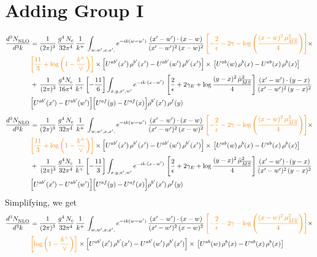 \documentclass[9pt]{article}
\numberwithin{equation}{section}
\begin{document}
\section{Adding Group I}
\begin{align}
     \frac{d^{3}N_{\rm NLO}^{\rm}}{d^{3}k} &  =  \frac{1}{(2\pi)^{3}}\, \frac{g^{4}\,N_{c}}{32\pi^{4}}\,\frac{1}{k^{+}}\, \int_{w, w',x,x',} e^{-ik(w-w^\prime)}\, \frac{(x'-w')\cdot (x-w)}{(x'-w')^{2}\, (x-w)^{2}}\, {\color{orange}\left[-\frac{2}{\epsilon}-2\gamma-\log{\left(\frac{(x-w)^{2}\,\mu^{2}_{\overline{MS}}}{4}\right)}\right]}\times \notag \\ & {\color{orange}\left[\frac{11}{3}+\log{\left(1-\frac{k^{+}}{\vee}\right)}\right]}\times\left[U^{ab'}(x')\,\rho^{b'}(x') - U^{ab'}(w')\,\rho^{b'}(x')\right]\times\,\left[U^{ab}(w)\,\rho^{b}(x) - U^{ab}(x)\,\rho^{b}(x)\right]\notag \\ & +\,\frac{1}{(2\pi)^{3}}\,\frac{g^{4}N_{c}}{16\pi^{4}}\,\frac{1}{k^{+}}\left[-\frac{11}{6}\right]\int_{x,y,x',w'}e^{-ik\cdot(x-w')}\,\left[\frac{2}{\epsilon}+2\gamma_{E}+\log\frac{(y-x)^{2}\,\bar\mu^{2}_{\overline{MS}}}{4}\right]\frac{(x'-w')\cdot(y-x)}{(x'-w')^{2}\,(y-x)^{2}}\notag \\ & \Big[U^{ab'}(x')-U^{ab'}(w')\Big]\Big[U^{af}(y)-U^{af}(x)\Big]\rho^{b'}(x')\,\rho^{f}(y)
\end{align}
\begin{align}
     \frac{d^{3}N_{\rm NLO}^{\rm}}{d^{3}k} &  =  \frac{1}{(2\pi)^{3}}\, \frac{g^{4}\,N_{c}}{32\pi^{4}}\,\frac{1}{k^{+}}\, \int_{w, w',x,x',} e^{-ik(w-w^\prime)}\, \frac{(x'-w')\cdot (x-w)}{(x'-w')^{2}\, (x-w)^{2}}\, {\color{orange}\left[-\frac{2}{\epsilon}-2\gamma-\log{\left(\frac{(x-w)^{2}\,\mu^{2}_{\overline{MS}}}{4}\right)}\right]}\times \notag \\ & {\color{orange}\left[\frac{11}{3}+\log{\left(1-\frac{k^{+}}{\vee}\right)}\right]}\times\left[U^{ab'}(x')\,\rho^{b'}(x') - U^{ab'}(w')\,\rho^{b'}(x')\right]\times\,\left[U^{ab}(w)\,\rho^{b}(x) - U^{ab}(x)\,\rho^{b}(x)\right]\notag \\ & +\,\frac{1}{(2\pi)^{3}}\,\frac{g^{4}N_{c}}{32\pi^{4}}\,\frac{1}{k^{+}}\left[-\frac{11}{3}\right]\int_{x,y,x',w'}e^{-ik\cdot(x-w')}\,\left[\frac{2}{\epsilon}+2\gamma_{E}+\log\frac{(y-x)^{2}\,\bar\mu^{2}_{\overline{MS}}}{4}\right]\frac{(x'-w')\cdot(y-x)}{(x'-w')^{2}\,(y-x)^{2}}\notag \\ & \Big[U^{ab'}(x')-U^{ab'}(w')\Big]\Big[U^{af}(y)-U^{af}(x)\Big]\rho^{b'}(x')\,\rho^{f}(y)
\end{align}
Simplifying, we get
\begin{align}
     \frac{d^{3}N_{\rm NLO}^{\rm}}{d^{3}k} &  =  \frac{1}{(2\pi)^{3}}\, \frac{g^{4}\,N_{c}}{32\pi^{4}}\,\frac{1}{k^{+}}\, \int_{w, w',x,x',} e^{-ik(w-w^\prime)}\, \frac{(x'-w')\cdot (x-w)}{(x'-w')^{2}\, (x-w)^{2}}\, {\color{orange}\left[-\frac{2}{\epsilon}-2\gamma-\log{\left(\frac{(x-w)^{2}\,\mu^{2}_{\overline{MS}}}{4}\right)}\right]}\times \notag \\ & {\color{orange}\left[\log{\left(1-\frac{k^{+}}{\vee}\right)}\right]}\times\left[U^{ab'}(x')\,\rho^{b'}(x') - U^{ab'}(w')\,\rho^{b'}(x')\right]\times\,\left[U^{ab}(w)\,\rho^{b}(x) - U^{ab}(x)\,\rho^{b}(x)\right]
\end{align}     
\end{document}
